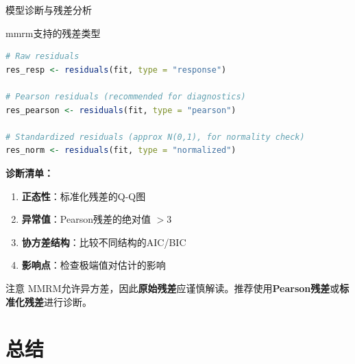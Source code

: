 \documentclass[aspectratio=169,11pt]{beamer}
\begin{document}
\begin{frame}[fragile]{模型诊断与残差分析}
\begin{block}{mmrm支持的残差类型}
\begin{lstlisting}[language=R,basicstyle=\ttfamily\scriptsize]
# Raw residuals
res_resp <- residuals(fit, type = "response")

# Pearson residuals (recommended for diagnostics)
res_pearson <- residuals(fit, type = "pearson")

# Standardized residuals (approx N(0,1), for normality check)
res_norm <- residuals(fit, type = "normalized")
\end{lstlisting}
\end{block}

\textbf{诊断清单：}
\begin{enumerate}
    \item \textbf{正态性}：标准化残差的Q-Q图
    \item \textbf{异常值}：Pearson残差的绝对值 $> 3$
    \item \textbf{协方差结构}：比较不同结构的AIC/BIC
    \item \textbf{影响点}：检查极端值对估计的影响
\end{enumerate}

\begin{alertblock}{注意}
MMRM允许异方差，因此\textbf{原始残差}应谨慎解读。推荐使用\textbf{Pearson残差}或\textbf{标准化残差}进行诊断。
\end{alertblock}
\end{frame}

\section{总结}
\end{document}
